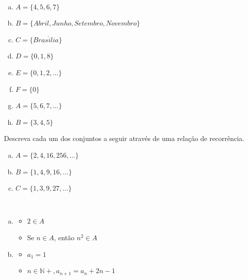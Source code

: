 \documentclass[a4paper, 12pt, addpoints]{exam}
\begin{document}
\begin{questions}
  \begin{resp}~
    \begin{multicols}{2}
    \begin{enumerate}[a)]
        \item $A = \{ 4, 5, 6, 7\}$
        \item $B = \{ Abril, Junho, Setembro, Novembro \}$
        \item $C = \{Bras\acute{i}lia\}$
        \item $D = \{ 0, 1, 8\}$
        \item $E = \{0, 1, 2, ...\}$
        \item $F = \{ 0 \}$
        \item $A = \{ 5, 6, 7, ...\}$
        \item $B = \{ 3, 4, 5\}$
    \end{enumerate}
\end{multicols}

\end{resp}

  \question Descreva cada um dos conjuntos a seguir através de uma relação de recorrência.

  \begin{enumerate}[a)]
    \item $A=\{2,4,16,256,...\}$
    \item $B=\{1,4,9,16,...\}$
    \item $C=\{1,3,9,27,...\}$
\end{enumerate} 

\begin{resp}~

    \begin{enumerate}[a)]
        \item
            
        \begin{itemize}
                \item $2 \in A$
                \item Se $n \in A$, então $n^2 \in A$
            \end{itemize}

        \item 
            
            \begin{itemize}
                    \item $a_1 = 1$
                    \item $n \in \mathbb{N+}, a_{n+1} = a_{n} + 2n - 1$
                \end{itemize}


\end{enumerate}
\end{resp}
\end{questions}
\end{document}
